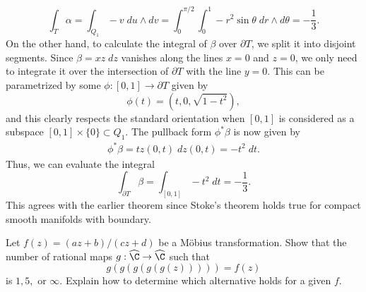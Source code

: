 \documentclass[11pt,letterpaper]{article}
\begin{document}
\begin{solution}
    \[
        \int_T \alpha = \int_{Q_1} -v\;du\wedge dv=\int_0^{\pi / 2}\int^1_0 -r^2\sin\theta\;dr\wedge d\theta = - \frac{1}{3}
    .\] 
    On the other hand, to calculate the integral of $\beta$ over $\partial T$, we split it into disjoint segments. Since $\beta=xz\;dz$ vanishes along the lines $x=0$ and $z=0$, we only need to integrate it over the intersection of $\partial T$ with the line $y=0$. This can be parametrized by some $\phi : [0,1]\to \partial T$ given by
    \[
        \phi(t) = \left(t, 0, \sqrt{1-t^2}\right),
    \]
    and this clearly respects the standard orientation when $[0,1]$ is considered as a subspace $[0,1]\times \{0\}\subset Q_1$. The pullback form $\phi^*\beta$ is now given by
    \[
        \begin{aligned}
            \phi^*\beta = tz(0,t)\;dz(0,t) = -t^2\;dt.
        \end{aligned}
    \]
    Thus, we can evaluate the integral
    \[
        \int_{\partial T} \beta = \int_{[0,1]} -t^2\;dt = -\frac{1}{3}
    .\]  
    This agrees with the earlier theorem since Stoke's theorem holds true for compact smooth manifolds with boundary.
\end{solution}

\begin{problem}
    Let $f(z)= (az+b)/(cz+d)$ be a M\"obius transformation. Show that the number of rational maps $g : \widehat{\C} \to \widehat{\C}$ such that
    \[
        g(g(g(g(g(z))))) = f(z)
    \]
    is $1, 5,$ or $\infty$. Explain how to determine which alternative holds for a given $f$.  
\end{problem}
\end{document}
